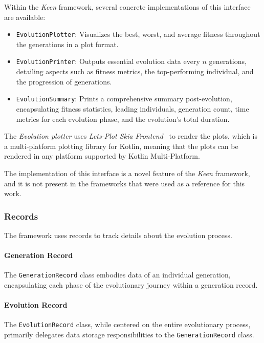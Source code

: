   Within the \textit{Keen} framework, several concrete implementations of this 
  interface are available:

  \begin{itemize}
    \item \texttt{EvolutionPlotter}: Visualizes the best, worst, and average 
      fitness throughout the generations in a plot format.
    \item \texttt{EvolutionPrinter}: Outputs essential evolution data every 
      \(n\) generations, detailing aspects such as fitness metrics, the 
      top-performing individual, and the progression of generations.
    \item \texttt{EvolutionSummary}: Prints a comprehensive summary 
      post-evolution, encapsulating fitness statistics, leading individuals, 
      generation count, time metrics for each evolution phase, and the 
      evolution's total duration.
  \end{itemize}

  \begin{remark}
    The \emph{Evolution plotter} uses \textit{Lets-Plot Skia Frontend}~\autocite{JetBrainsLetsplotskiaSkia} to render
    the plots, which is a multi-platform plotting library for Kotlin, meaning that the plots can be rendered in any 
    platform supported by Kotlin Multi-Platform.
  \end{remark}

  The implementation of this interface is a novel feature of the \textit{Keen}
  framework, and it is not present in the frameworks that were used as a
  reference for this work.

  \subsubsection{Records}
    The framework uses records to track details about the evolution process.

    \paragraph{Generation Record}
      The \texttt{GenerationRecord} class embodies data of an individual 
      generation, encapsulating each phase of the evolutionary journey within a 
      generation record.

    \paragraph{Evolution Record}
      The \texttt{EvolutionRecord} class, while centered on the entire 
      evolutionary process, primarily delegates data storage responsibilities 
      to the \texttt{GenerationRecord} class.
      